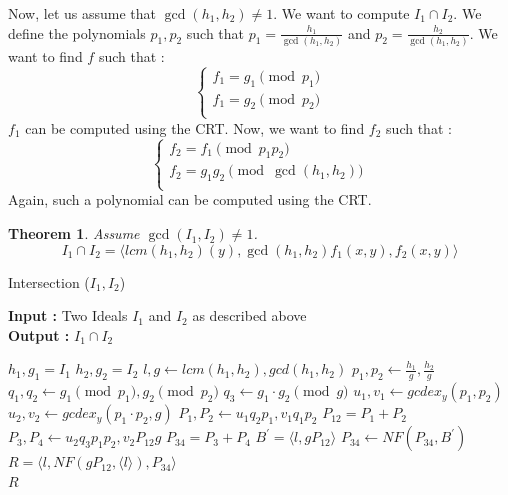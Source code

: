 \documentclass{article}
\newtheorem{theorem}{Theorem}[section]
\begin{document}
Now, let us assume that $\gcd(h_{1}, {h_2}) \neq 1$. 
We want to compute $I_{1} \cap I_{2}$. We define the polynomials $p_{1}, p_{2}$ such that $p_{1} = \displaystyle \frac{h_{1}}{\gcd(h_{1}, h_{2})}$ and $p_{2} = \displaystyle \frac{h_{2}}{\gcd(h_{1}, h_{2})}$. We want to find $f$ such that : 
\begin{displaymath}
    \left\{
    \begin{array}{ll}
        f_{1} = g_{1} \pmod {p_{1}} \\
        f_{1} = g_{2} \pmod {p_{2}} \\
    \end{array}
    \right.
\end{displaymath}
$f_{1}$ can be computed using the CRT. Now, we want to find $f_{2}$ such that : 
\begin{displaymath}
    \left\{
    \begin{array}{ll}
        f_{2} = f_{1} \pmod {p_{1}p_{2}} \\
        f_{2} = g_{1}g_{2} \pmod {\gcd(h_{1}, h_{2})} \\
    \end{array}
    \right.
\end{displaymath}
Again, such a polynomial can be computed using the CRT. 

\begin{theorem}
    Assume $\gcd(I_{1}, I_{2}) \neq 1$. 
    \begin{displaymath}
        I_{1} \cap I_{2} = \langle lcm(h_{1}, h_{2})(y), \gcd(h_{1},h_{2})f_{1}(x,y), f_{2}(x,y) \rangle
    \end{displaymath}
\end{theorem}

\begin{algorithm}
    \caption{Intersection ($I_{1}, I_{2}$)}\label{alg:intersect-2-ideals}
    \textbf{Input : }Two Ideals $I_{1}$ and $I_{2}$ as described above \\
    \textbf{Output : }$I_{1} \cap I_{2}$
\begin{algorithmic}
    \State $h_{1}, g_{1} = I_{1}$ 
    \State $h_{2}, g_{2} = I_{2}$ 
    \State $l, g \gets lcm(h_{1}, h_{2}), gcd(h_{1}, h_{2})$
    \State $p_{1}, p_{2} \gets \frac{h_{1}}{g}, \frac{h_{2}}{g}$
    \State $q_{1}, q_{2} \gets g_{1} \pmod {p_{1}}, g_{2} \pmod {p_{2}}$
    \State $q_{3} \gets g_{1} \cdot g_{2} \pmod {g}$ 
    \State $u_{1}, v_{1} \gets gcdex_{y} (p_{1}, p_{2})$ 
    \State $u_{2}, v_{2} \gets gcdex_{y} (p_{1} \cdot p_{2}, g)$ 
    \State $P_{1}, P_{2} \gets u_{1}q_{2}p_{1}, v_{1}q_{1}p_{2}$ 
    \State $P_{12} = P_{1} + P_{2}$
    \State $P_{3}, P_{4} \gets u_{2}q_{3}p_{1}p_{2}, v_{2}P_{12}g$
    \State $P_{34} = P_{3} + P_{4}$
    \State $B^{\prime} = \langle l, gP_{12} \rangle$
    \State $P_{34} \gets NF(P_{34}, B^{\prime})$
    \State $R = \langle l, NF(gP_{12}, \langle l \rangle), P_{34} \rangle$ \\
    \Return $R$
\end{algorithmic}
\end{algorithm}
\end{document}
